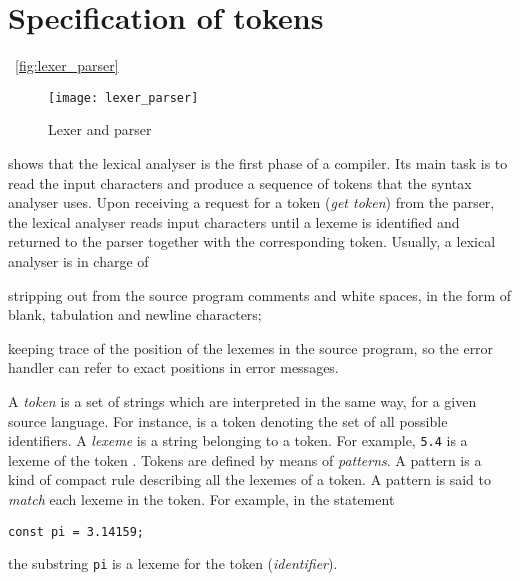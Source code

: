 \section{Specification of tokens}

\Fig~\vref{fig:lexer_parser}
\begin{figure}[b]
\centering
\texttt{[image: lexer\_parser]}
\caption{Lexer and parser}
\label{fig:lexer_parser}
\end{figure}
shows that the lexical analyser is the first phase of a compiler. Its
main task is to read the input characters and produce a sequence of
tokens that the syntax analyser uses. Upon receiving a request for a
token (\emph{get token}) from the parser, the lexical analyser reads
input characters until a lexeme is identified and returned to the
parser together with the corresponding token. Usually, a lexical
analyser is in charge of
\begin{itemize*}

  \item stripping out from the source program comments and white
    spaces, in the form of blank, tabulation and newline characters;

  \item keeping trace of the position of the lexemes in the source
    program, so the error handler can refer to exact positions in
    error messages.

\end{itemize*}
A \emph{token} is a set of strings which are interpreted in the same
way, for a given source language. For instance,  is a
token denoting the set of all possible identifiers. A \emph{lexeme} is
a string belonging to a token. For example, \verb+5.4+ is a lexeme of
the token . Tokens are defined by means of
\emph{patterns}. A pattern is a kind of compact rule describing all
the lexemes of a token. A pattern is said to \emph{match} each lexeme
in the token. For example, in the \Pascal statement
\begin{verbatim}
const pi = 3.14159;
\end{verbatim}
the substring \texttt{pi} is a lexeme for the token 
(\emph{identifier}).

